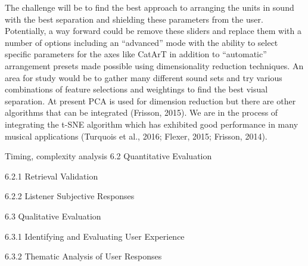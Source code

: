 The challenge will be to find the best approach to arranging the units in sound with the best separation and shielding these parameters from the user. Potentially, a way forward could be remove these sliders and replace them with a number of options including an “advanced” mode with the ability to select specific parameters for the axes like CatArT in addition to “automatic” arrangement presets made possible using dimensionality reduction techniques. An area for study would be to gather many different sound sets and try various combinations of feature selections and weightings to find the best visual separation. At present PCA is used for dimension reduction but there are other algorithms that can be integrated (Frisson, 2015). We are in the process of integrating the t-SNE algorithm which has exhibited good performance in many musical applications (Turquois et al., 2016; Flexer, 2015; Frisson, 2014).

Timing, complexity analysis
6.2 Quantitative Evaluation

6.2.1 Retrieval Validation


6.2.2 Listener Subjective Responses

6.3 Qualitative Evaluation

6.3.1 Identifying and Evaluating User Experience

6.3.2 Thematic Analysis of User Responses
